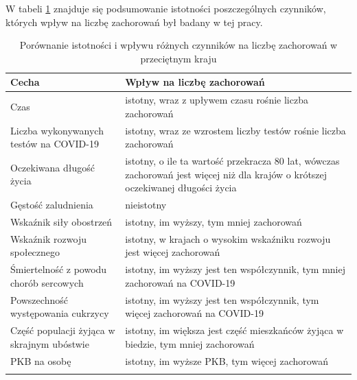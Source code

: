 \documentclass[12pt]{mwbk}
\theoremstyle{plain}
\theoremstyle{definition}
\theoremstyle{remark}
\newcommand\zrodlo[1]{\par\vspace{-3mm}{\small\textit{Źródło: }#1 }}
\begin{document}

W tabeli \ref{tab:istotnosc} znajduje się podsumowanie istotności poszczególnych czynników, których wpływ na liczbę zachorowań był badany w tej pracy.


\begin{longtable}{| p{} | p{} |}
	\hline
	Cecha & Wpływ na liczbę zachorowań \\ \hline 
	Czas & istotny, wraz z upływem czasu rośnie liczba zachorowań \\ \hline
	Liczba wykonywanych testów na COVID-19 & istotny, wraz ze wzrostem liczby testów rośnie liczba zachorowań \\ \hline
	Oczekiwana długość życia & istotny, o ile ta wartość przekracza 80 lat, wówczas zachorowań jest więcej niż dla krajów o krótszej oczekiwanej długości życia \\ \hline 
	Gęstość zaludnienia & nieistotny \\ \hline
	Wskaźnik siły obostrzeń & istotny, im wyższy, tym mniej zachorowań \\ \hline
	Wskaźnik rozwoju społecznego & istotny, w krajach o wysokim wskaźniku rozwoju jest więcej zachorowań \\ \hline
	Śmiertelność z powodu chorób sercowych & istotny, im wyższy jest ten współczynnik, tym mniej zachorowań na COVID-19 \\ \hline
	Powszechność występowania cukrzycy & istotny, im wyższy jest ten współczynnik, tym więcej zachorowań na COVID-19 \\ \hline
	Część populacji żyjąca w skrajnym ubóstwie & istotny, im większa jest część mieszkańców żyjąca w biedzie, tym mniej zachorowań \\ \hline
	PKB na osobę & istotny, im wyższe PKB, tym więcej zachorowań \\ \hline
	\caption{Porównanie istotności i wpływu różnych czynników na liczbę zachorowań w przeciętnym kraju}
	
	\label{tab:istotnosc}
	
	\end{longtable}
\begin{center}\zrodlo{Opracowanie własne}
	\end{center}
\newpage
\end{document}
